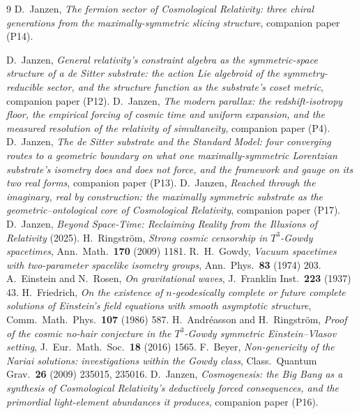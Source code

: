 \documentclass[11pt,a4paper]{article}
\theoremstyle{plain}
\theoremstyle{definition}
\theoremstyle{remark}
\begin{document}
\begin{thebibliography}{9}
 D.~Janzen, \emph{The fermion sector of Cosmological Relativity: three chiral generations from the maximally-symmetric slicing structure}, companion paper (P14).

 D.~Janzen, \emph{General relativity's constraint algebra as the symmetric-space structure of a de Sitter substrate: the action Lie algebroid of the symmetry-reducible sector, and the structure function as the substrate's coset metric}, companion paper (P12).
 D.~Janzen, \emph{The modern parallax: the redshift-isotropy floor, the empirical forcing of cosmic time and uniform expansion, and the measured resolution of the relativity of simultaneity}, companion paper (P4).
 D.~Janzen, \emph{The de Sitter substrate and the Standard Model: four converging routes to a geometric boundary on what one maximally-symmetric Lorentzian substrate's isometry does and does not force, and the framework and gauge on its two real forms}, companion paper (P13).
 D.~Janzen, \emph{Reached through the imaginary, real by construction: the maximally symmetric substrate as the geometric--ontological core of Cosmological Relativity}, companion paper (P17).
 D.~Janzen, \emph{Beyond Space-Time: Reclaiming Reality from the Illusions of Relativity} (2025).
 H.~Ringstr\"om, \emph{Strong cosmic censorship in $T^3$-Gowdy spacetimes}, Ann.\ Math.\ \textbf{170} (2009) 1181.
 R.~H.~Gowdy, \emph{Vacuum spacetimes with two-parameter spacelike isometry groups}, Ann.\ Phys.\ \textbf{83} (1974) 203.
 A.~Einstein and N.~Rosen, \emph{On gravitational waves}, J.\ Franklin Inst.\ \textbf{223} (1937) 43.
 H.~Friedrich, \emph{On the existence of $n$-geodesically complete or future complete solutions of Einstein's field equations with smooth asymptotic structure}, Comm.\ Math.\ Phys.\ \textbf{107} (1986) 587.
 H.~Andr\'easson and H.~Ringstr\"om, \emph{Proof of the cosmic no-hair conjecture in the $T^3$-Gowdy symmetric Einstein--Vlasov setting}, J.\ Eur.\ Math.\ Soc.\ \textbf{18} (2016) 1565.
 F.~Beyer, \emph{Non-genericity of the Nariai solutions: investigations within the Gowdy class}, Class.\ Quantum Grav.\ \textbf{26} (2009) 235015, 235016.
 D.~Janzen, \emph{Cosmogenesis: the Big Bang as a synthesis of Cosmological Relativity's deductively forced consequences, and the primordial light-element abundances it produces}, companion paper (P16).

\end{thebibliography}
\end{document}
